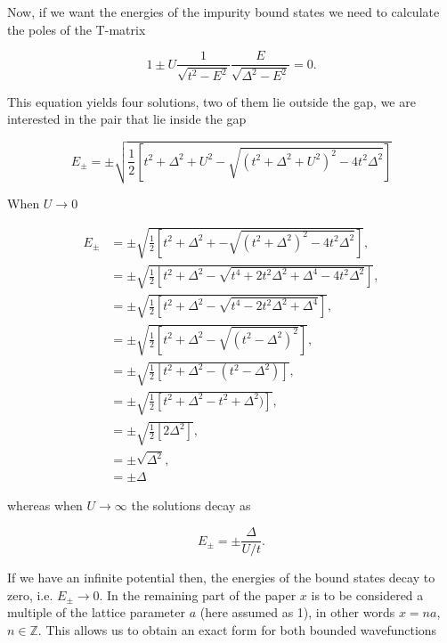 Now, if we want the energies of the impurity bound states we need to calculate the poles of the T-matrix

\begin{equation}
    1 \pm U \frac{1}{\sqrt{t^2 - E^2}}\frac{E}{\sqrt{\Delta^2 - E^2}} = 0.
\end{equation}

This equation yields four solutions, two of them lie outside the gap, we are interested in the pair that lie inside the gap

\begin{equation}
    E_\pm = \pm \sqrt{\frac{1}{2}\left[ t^2 + \Delta^2 + U^2 - \sqrt{(t^2 + \Delta^2 + U^2)^2 - 4t^2\Delta^2}\right]}
\end{equation}

When $U\rightarrow0$

\begin{equation*}
    \begin{aligned}
        E_\pm &= \pm \sqrt{\frac{1}{2}\left[ t^2 + \Delta^2 + - \sqrt{(t^2 + \Delta^2)^2 - 4t^2\Delta^2}\right]},\\
        &= \pm \sqrt{\frac{1}{2}\left[ t^2 + \Delta^2 - \sqrt{t^4 + 2t^2\Delta^2 + \Delta^4 - 4t^2\Delta^2}\right]},\\
        &= \pm \sqrt{\frac{1}{2}\left[ t^2 + \Delta^2 - \sqrt{t^4 - 2t^2\Delta^2 + \Delta^4}\right]},\\
        &= \pm \sqrt{\frac{1}{2}\left[ t^2 + \Delta^2 - \sqrt{(t^2 - \Delta^2)^2}\right]},\\
        &= \pm \sqrt{\frac{1}{2}\left[ t^2 + \Delta^2 - (t^2 - \Delta^2)\right]},\\
        &= \pm \sqrt{\frac{1}{2}\left[ t^2 + \Delta^2 - t^2 + \Delta^2)\right]},\\
        &= \pm \sqrt{\frac{1}{2}\left[ 2\Delta^2\right]},\\
        &= \pm \sqrt{\Delta^2},\\
        &= \pm \Delta
    \end{aligned}
\end{equation*}

whereas when $U\rightarrow \infty$ the solutions decay as 

\begin{equation}
    E_\pm = \pm \frac{\Delta}{U/t}. 
\end{equation}

If we have an infinite potential then, the energies of the bound states decay to zero, i.e. $E_\pm \rightarrow 0$. In the remaining part of the paper $x$ is to be considered a multiple of the lattice parameter 
$a$ (here assumed as 1), in other words $x=na$, $n\in \mathbb{Z}$. This allows us to obtain an exact form for both bounded wavefunctions

